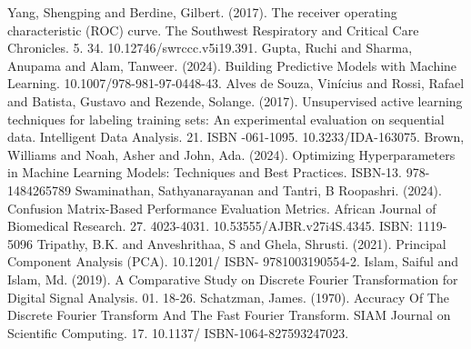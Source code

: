 \documentclass[english,12pt,oneside,a4paper]{article}
\begin{document}
\begin{thebibliography}{15}
		Yang, Shengping and Berdine, Gilbert. (2017). The receiver operating characteristic (ROC) curve. The Southwest Respiratory and Critical Care Chronicles. 5. 34. 10.12746/swrccc.v5i19.391. 
		Gupta, Ruchi and Sharma, Anupama and Alam, Tanweer. (2024). Building Predictive Models with Machine Learning. 10.1007/978-981-97-0448-43. 
		Alves de Souza, Vinícius and Rossi, Rafael and Batista, Gustavo and Rezende, Solange. (2017). Unsupervised active learning techniques for labeling training sets: An experimental evaluation on sequential data. Intelligent Data Analysis. 21. ISBN -061-1095. 10.3233/IDA-163075. 
		Brown, Williams and Noah, Asher and John, Ada. (2024). Optimizing Hyperparameters in Machine Learning Models: Techniques and Best Practices. ISBN-13. 978-1484265789 
		Swaminathan, Sathyanarayanan and Tantri, B Roopashri. (2024). Confusion Matrix-Based Performance Evaluation Metrics. African Journal of Biomedical Research. 27. 4023-4031. 10.53555/AJBR.v27i4S.4345. ISBN: 1119-5096
		Tripathy, B.K. and Anveshrithaa, S and Ghela, Shrusti. (2021). Principal Component Analysis (PCA). 10.1201/ ISBN- 9781003190554-2. 
		Islam, Saiful and Islam, Md. (2019). A Comparative Study on Discrete Fourier Transformation for Digital Signal Analysis. 01. 18-26. 
		Schatzman, James. (1970). Accuracy Of The Discrete Fourier Transform And The Fast Fourier Transform. SIAM Journal on Scientific Computing. 17. 10.1137/ ISBN-1064-827593247023. 
		\end{thebibliography}
\end{document}
